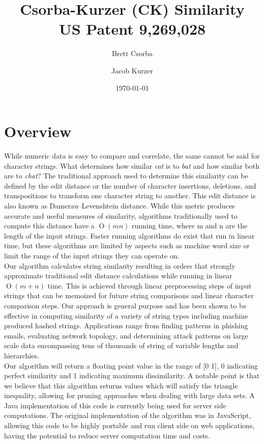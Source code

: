 \documentclass[10pt]{article}
\title{Csorba-Kurzer (CK) Similarity \\ \large US Patent 9,269,028}
\date{\today}
\author{Brett Csorba \and Jacob Kurzer}
\newcommand{\bigO}[1]{\ensuremath{\operatorname{O}\left(#1\right)}}
\begin{document}
\maketitle

\section{Overview}
While numeric data is easy to compare and correlate, the same cannot be said for character strings.  What determines how similar \textit{cat} is to \textit{bat} and how similar both are to \textit{chat}?  The traditional approach used to determine this similarity can be defined by the edit distance or the number of character insertions, deletions, and transpositions to transform one character string to another.  This edit distance is also known as Damerau--Levenshtein distance.  While this metric produces accurate and useful measures of similarity, algorithms traditionally used to compute this distance have a \bigO{mn} running time, where m and n are the length of the input strings.  Faster running algorithms do exist that run in linear time, but these algorithms are limited by aspects such as machine word size or limit the range of the input strings they can operate on.\\[2ex]
Our algorithm calculates string similarity resulting in orders that strongly approximate traditional edit distance calculations while running in linear \bigO{m+n} time.  This is achieved through linear preprocessing steps of input strings that can be memoized for future string comparisons and linear character comparison steps.  Our approach is general purpose and has been shown to be effective in computing similarity of a variety of string types including machine produced hashed strings.  Applications range from finding patterns in phishing emails, evaluating network topology, and determining attack patterns on large scale data encompassing tens of thousands of string of variable lengths and hierarchies.\\[2ex]
Our algorithm will return a floating point value in the range of [0 1], 0 indicating perfect similarity and 1 indicating maximum dissimilarity.  A notable point is that we believe that this algorithm returns values which will satisfy the triangle inequality, allowing for pruning approaches when dealing with large data sets.  A Java implementation of this code is currently being used for server side computations.  The original implementation of the algorithm was in JavaScript, allowing this code to be highly portable and run client side on web applications, having the potential to reduce server computation time and costs.
  
\end{document}
